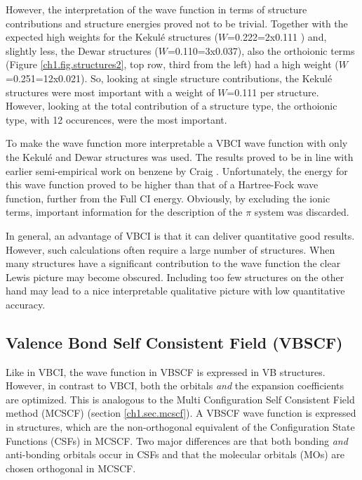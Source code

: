 However, the interpretation of the wave function in terms of structure contributions and structure energies proved not  to be trivial. Together with the expected high weights for the Kekul\'{e} structures ($W$=0.222=2x0.111 \cite{vbci175_2}) and, slightly less, the Dewar structures ($W$=0.110=3x0.037), also the orthoionic terms (Figure \ref{ch1.fig.structures2}, top row, third from the left) had a high weight ($W$=0.251=12x0.021). So, looking at single structure contributions, the Kekul\'e structures were most important with a weight of $W$=0.111 per structure. However, looking at the total contribution of a structure type, the orthoionic type, with 12 occurences, were the most important.

To make the wave function more interpretable a VBCI wave function with only the Kekul\'{e} and Dewar structures was used. The results proved to be in line with earlier semi-empirical work on benzene by Craig \cite{craig}. Unfortunately, the energy for this wave function proved to be higher than that of a Hartree-Fock wave function, further from the Full CI energy. Obviously, by excluding the ionic terms, important information for the description of the $\pi$ system was discarded.

In general, an advantage of VBCI is that it can deliver quantitative good results. However, such calculations often require a large number of structures. When many structures have a significant contribution to the wave function the clear Lewis picture may become obscured. Including too few structures on the other hand may lead to a nice interpretable qualitative picture with low quantitative accuracy. 

\subsection{\label{ch1.sec.vbscf}Valence Bond Self Consistent Field (VBSCF)}

Like in VBCI, the wave function in VBSCF is expressed in VB structures. However, in contrast to VBCI, both the orbitals \textit{and} the expansion coefficients are optimized. This is analogous to the Multi Configuration Self Consistent Field method (MCSCF) (section \ref{ch1.sec.mcscf}). A VBSCF wave function is  expressed in structures, which are the non-orthogonal equivalent of the Configuration State Functions (CSFs) in MCSCF.  Two major differences are that both bonding \textit{and} anti-bonding orbitals occur in CSFs and that the molecular orbitals (MOs) are chosen orthogonal in MCSCF.

